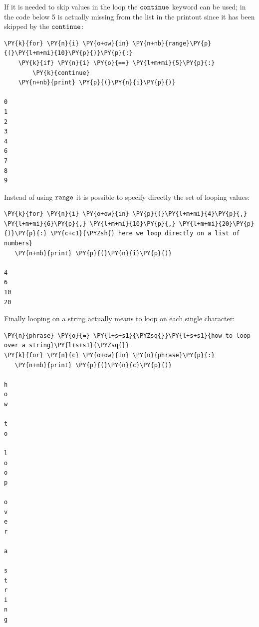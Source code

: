 If it is needed to skip values in the loop the $\tt{continue}$ keyword can be used; in the code below 5 is actually missing from the list in the printout since it has been skipped by the $\tt{continue}$:

\begin{tcolorbox}[breakable, size=fbox, boxrule=1pt, pad at break*=1mm, colback=cellbackground, colframe=cellborder]            
\begin{Verbatim}[commandchars=\\\{\}]
\PY{k}{for} \PY{n}{i} \PY{o+ow}{in} \PY{n+nb}{range}\PY{p}{(}\PY{l+m+mi}{10}\PY{p}{)}\PY{p}{:}
    \PY{k}{if} \PY{n}{i} \PY{o}{==} \PY{l+m+mi}{5}\PY{p}{:}
        \PY{k}{continue} 
    \PY{n+nb}{print} \PY{p}{(}\PY{n}{i}\PY{p}{)}

0
1
2
3
4
6
7
8
9
\end{Verbatim}
\end{tcolorbox}

Instead of using $\tt{range}$ it is possible to specify directly the set of looping values:

\begin{tcolorbox}[breakable, size=fbox, boxrule=1pt, pad at break*=1mm, colback=cellbackground, colframe=cellborder]            

\begin{Verbatim}[commandchars=\\\{\}]
\PY{k}{for} \PY{n}{i} \PY{o+ow}{in} \PY{p}{(}\PY{l+m+mi}{4}\PY{p}{,} \PY{l+m+mi}{6}\PY{p}{,} \PY{l+m+mi}{10}\PY{p}{,} \PY{l+m+mi}{20}\PY{p}{)}\PY{p}{:} \PY{c+c1}{\PYZsh{} here we loop directly on a list of numbers}
   \PY{n+nb}{print} \PY{p}{(}\PY{n}{i}\PY{p}{)}

4
6
10
20
\end{Verbatim}
\end{tcolorbox}

Finally looping on a string actually means to loop on each single character:
 
\begin{tcolorbox}[breakable, size=fbox, boxrule=1pt, pad at break*=1mm, colback=cellbackground, colframe=cellborder]            
\begin{Verbatim}[commandchars=\\\{\}]
\PY{n}{phrase} \PY{o}{=} \PY{l+s+s1}{\PYZsq{}}\PY{l+s+s1}{how to loop over a string}\PY{l+s+s1}{\PYZsq{}}
\PY{k}{for} \PY{n}{c} \PY{o+ow}{in} \PY{n}{phrase}\PY{p}{:}
   \PY{n+nb}{print} \PY{p}{(}\PY{n}{c}\PY{p}{)}

h
o
w
 
t
o
 
l
o
o
p
 
o
v
e
r
 
a
 
s
t
r
i
n
g
\end{Verbatim}
\end{tcolorbox}

